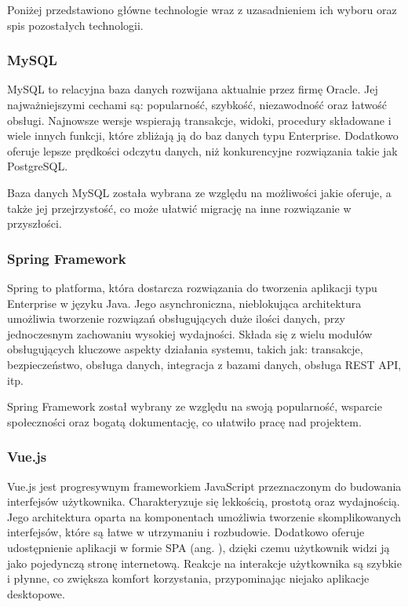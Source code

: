 Poniżej przedstawiono główne technologie wraz z uzasadnieniem ich wyboru oraz spis pozostałych technologii.

\subsubsection*{MySQL}

MySQL \cite{bib:mysql} to relacyjna baza danych rozwijana aktualnie przez firmę Oracle. Jej najważniejszymi cechami są: popularność, szybkość, niezawodność oraz łatwość obsługi. Najnowsze wersje wspierają transakcje, widoki, procedury składowane i wiele innych funkcji, które zbliżają ją do baz danych typu Enterprise. Dodatkowo oferuje lepsze prędkości odczytu danych, niż konkurencyjne rozwiązania takie jak PostgreSQL.

Baza danych MySQL została wybrana ze względu na możliwości jakie oferuje, a także jej przejrzystość, co może ułatwić migrację na inne rozwiązanie w przyszłości.

\subsubsection*{Spring Framework}

Spring \cite{bib:spring} to platforma, która dostarcza rozwiązania do tworzenia aplikacji typu Enterprise w języku Java. Jego asynchroniczna, nieblokująca architektura umożliwia tworzenie rozwiązań obsługujących duże ilości danych, przy jednoczesnym zachowaniu wysokiej wydajności. Składa się z wielu modułów obsługujących kluczowe aspekty działania systemu, takich jak: transakcje, bezpieczeństwo, obsługa danych, integracja z bazami danych, obsługa REST API, itp.

Spring Framework został wybrany ze względu na swoją popularność, wsparcie społeczności oraz bogatą dokumentację, co ułatwiło pracę nad projektem.

\subsubsection*{Vue.js}

Vue.js \cite{bib:vuejs} jest progresywnym frameworkiem JavaScript przeznaczonym do budowania interfejsów użytkownika. Charakteryzuje się lekkością, prostotą oraz wydajnością. Jego architektura oparta na komponentach umożliwia tworzenie skomplikowanych interfejsów, które są łatwe w utrzymaniu i rozbudowie. Dodatkowo oferuje udostępnienie aplikacji w formie SPA (ang. ), dzięki czemu użytkownik widzi ją jako pojedynczą stronę internetową. Reakcje na interakcje użytkownika są szybkie i płynne, co zwiększa komfort korzystania, przypominając niejako aplikacje desktopowe.


